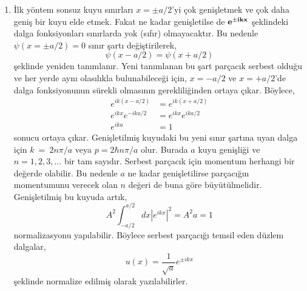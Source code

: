 \documentclass[a4paper,12pt, twoside]{article}
\begin{document}
\begin{enumerate}
	\item İlk yöntem sonsuz kuyu sınırları $x=\pm a/2$'yi çok genişletmek ve çok daha geniş bir kuyu elde etmek. Fakat ne kadar genişletilse de $\bf e ^ { \pm i k x }$ şeklindeki dalga fonksiyonları sınırlarda yok (sıfır) olmayacaktır. Bu nedenle $\psi (x=\pm a / 2 ) = 0$ sınır şartı değiştirilerek,
	\begin{equation}
	\psi ( x-a/2) = \psi ( x + a/2 )
	\end{equation}
	şeklinde yeniden tanımlanır. Yeni tanımlanan bu şart parçacık serbest olduğu ve her yerde aynı olasılıkla bulunabileceği için, $x=-a/2$ ve $x=+a/2$'de  dalga fonksiyonunun sürekli olmasının gerekliliğinden ortaya çıkar. Böylece,
	\begin{align*}
	e ^ { i k (x-a/2) } &= e ^ { i k (x+a/2) }\\
	e ^ { i k x}	e ^ { -i k a/2}  &= e ^ { i k x } 	e ^ { i k a/2} \\
	e ^ { i k a} &= 1
	\end{align*}
	sonucu ortaya çıkar. Genişletilmiş kuyudaki bu yeni sınır şartına uyan dalga için $k~=~2 n \pi / a$ veya $p = 2 \hbar n \pi / a$ olur. Burada $a$ kuyu genişliği ve $n=1,2,3, \ldots$ bir tam sayıdır. Serbest parçacık için momentum herhangi bir değerde olabilir. Bu nedenle $a$ ne kadar genişletilirse parçacığın momentumunu verecek olan $n$ değeri de buna göre büyütülmelidir. Genişletilmiş bu kuyuda artık,
	\begin{equation}
	A ^ { 2 } \int _ { -a/2 } ^ { a/2 } d x \left| e ^ { i k x } \right| ^ { 2 } = A ^ { 2 } a = 1
	\end{equation}
	normalizasyonu yapılabilir. Böylece serbest parçacığı temsil eden düzlem dalgalar,
	\begin{equation}
	u(x) = \frac{1}{\sqrt{a}} e ^ { \pm i k x }
	\end{equation}
	şeklinde normalize edilmiş olarak yazılabilirler.
	

\end{enumerate}
\end{document}
